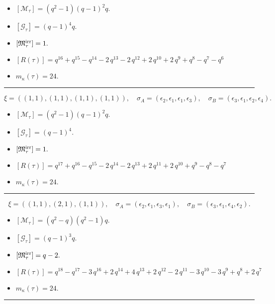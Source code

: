 \documentclass[10pt,a4paper]{amsart}
\begin{document}
\begin{itemize}
 \item $[\mathcal{M}_{\tau}] = {\left(q^{2} - 1\right)} {\left(q - 1\right)}^{2} q .$

 \item $[\mathcal{G}_{\tau}] = {\left(q - 1\right)}^{4} q .$

 \item $[{\frak M}_{\tau}^{\textrm{irr}}] = 1 .$

 \item $[R(\tau)] = q^{16} + q^{15} - q^{14} - 2 \, q^{13} - 2 \, q^{12} + 2 \, q^{10} + 2 \, q^{9} + q^{8} - q^{7} - q^{6} $

 \item $m_{\kappa}(\tau) = 24 .$

 \end{itemize}
\noindent\rule{8cm}{0.4pt}

$$\xi = ({(1, 1)}, {(1, 1), (1, 1)}, {(1, 1)}),\quad \sigma_A = ({{\epsilon_2}}, {{\epsilon_1}, {\epsilon_1}}, {{\epsilon_3}}),\quad \sigma_B = ({{\epsilon_3}}, {{\epsilon_1}, {\epsilon_2}}, {{\epsilon_4}}).$$

\begin{itemize}
 \item $[\mathcal{M}_{\tau}] = {\left(q^{2} - 1\right)} {\left(q - 1\right)}^{2} q .$

 \item $[\mathcal{G}_{\tau}] = {\left(q - 1\right)}^{4} .$

 \item $[{\frak M}_{\tau}^{\textrm{irr}}] = 1 .$

 \item $[R(\tau)] = q^{17} + q^{16} - q^{15} - 2 \, q^{14} - 2 \, q^{13} + 2 \, q^{11} + 2 \, q^{10} + q^{9} - q^{8} - q^{7} $

 \item $m_{\kappa}(\tau) = 24 .$

 \end{itemize}
\noindent\rule{8cm}{0.4pt}

$$\xi = ({(1, 1)}, {(2, 1)}, {(1, 1)}),\quad \sigma_A = ({{\epsilon_2}}, {{\epsilon_1, \epsilon_3}}, {{\epsilon_1}}),\quad \sigma_B = ({{\epsilon_3}}, {{\epsilon_1, \epsilon_4}}, {{\epsilon_2}}).$$

\begin{itemize}
 \item $[\mathcal{M}_{\tau}] = {\left(q^{2} - q\right)} {\left(q^{2} - 1\right)} q .$

 \item $[\mathcal{G}_{\tau}] = {\left(q - 1\right)}^{3} q .$

 \item $[{\frak M}_{\tau}^{\textrm{irr}}] = q - 2 .$

 \item $[R(\tau)] = q^{18} - q^{17} - 3 \, q^{16} + 2 \, q^{14} + 4 \, q^{13} + 2 \, q^{12} - 2 \, q^{11} - 3 \, q^{10} - 3 \, q^{9} + q^{8} + 2 \, q^{7} $

 \item $m_{\kappa}(\tau) = 24 .$

 \end{itemize}
\noindent\rule{8cm}{0.4pt}
\end{document}
